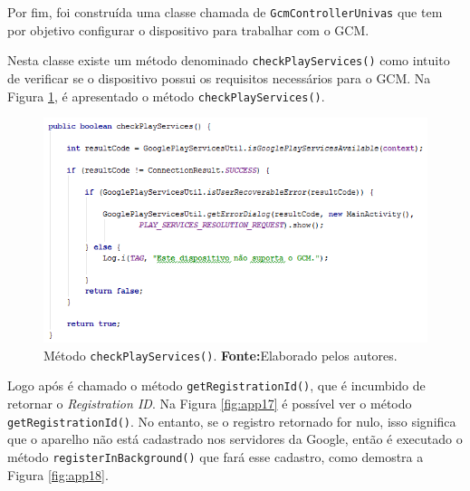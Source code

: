 	\par Por fim, foi construída uma classe chamada de \texttt{GcmControllerUnivas}
que tem por objetivo configurar o dispositivo para trabalhar com o GCM.

	\par Nesta classe existe um método denominado \texttt{checkPlayServices()} como
intuito de verificar se o dispositivo possui os requisitos necessários para o
GCM. Na Figura \ref{fig:app16}, é apresentado o método
\texttt{checkPlayServices()}.

		\begin{figure}[h!] 
			\centerline{\includegraphics[scale=0.8]{./imagens/2_q_metodologico/4_procedimentos_resultados/42_aplicativo/app16.png}}
			\caption[Método checkPlayServices()]{Método \texttt{checkPlayServices()}.
			\textbf{Fonte:}Elaborado pelos autores.}
			\label{fig:app16}
		\end{figure}
	
	\pagebreak
	
	\par Logo após é chamado o método \texttt{getRegistrationId()}, que é incumbido
de retornar o \textit{Registration ID}. Na Figura \ref{fig:app17} é possível ver
o método \texttt{getRegistrationId()}. No entanto, se o registro retornado for nulo,
isso significa que o aparelho não está cadastrado nos servidores da Google,
então é executado o método \texttt{registerInBackground()} que fará esse
cadastro, como demostra a Figura \ref{fig:app18}.


